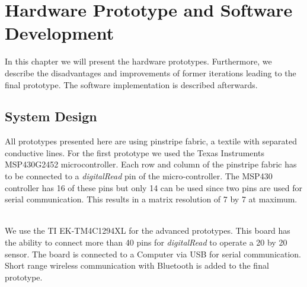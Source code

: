 %
\chapter{Hardware Prototype and Software Development}
\label{Hardware Prototype and Software Development} 
In this chapter we will present the hardware prototypes. Furthermore, we describe the disadvantages and improvements of former iterations leading to the final prototype. The software implementation is described afterwards.

\section{System Design}
All prototypes presented here are using pinstripe fabric, a textile with separated conductive lines. For the first prototype we used the Texas Instruments MSP430G2452 microcontroller. Each row and column of the pinstripe fabric has to be connected to a \emph{digitalRead} pin of the micro-controller. The MSP430 controller has 16 of these pins but only 14 can be used since two pins are used for serial communication. This results in a matrix resolution of 7 by 7 at maximum. 
\\ \\

We use the TI EK-TM4C1294XL for the advanced prototypes. This board has the ability to connect more than 40 pins for \emph{digitalRead} to operate a 20 by 20 sensor. The board is connected to a Computer via USB for serial communication. Short range wireless communication with Bluetooth is added to the final prototype.\\

